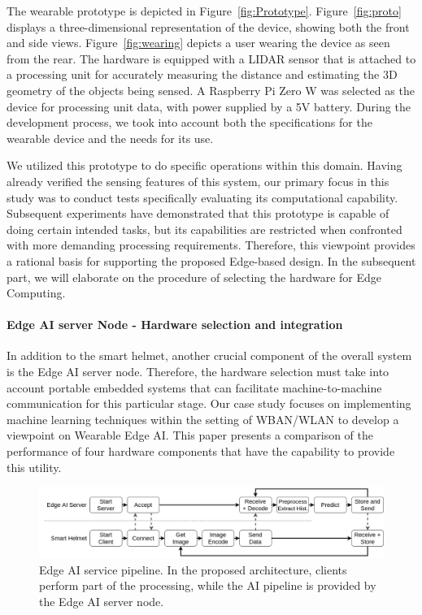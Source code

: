 The wearable prototype is depicted in Figure~\ref{fig:Prototype}. Figure~\ref{fig:proto} displays a three-dimensional representation of the device, showing both the front and side views. Figure~\ref{fig:wearing} depicts a user wearing the device as seen from the rear. The hardware is equipped with a LIDAR sensor that is attached to a processing unit for accurately measuring the distance and estimating the 3D geometry of the objects being sensed. A Raspberry Pi Zero W was selected as the device for processing unit data, with power supplied by a 5V battery. During the development process, we took into account both the specifications for the wearable device and the needs for its use.

We utilized this prototype to do specific operations within this domain. Having already verified the sensing features of this system, our primary focus in this study was to conduct tests specifically evaluating its computational capability. Subsequent experiments have demonstrated that this prototype is capable of doing certain intended tasks, but its capabilities are restricted when confronted with more demanding processing requirements. Therefore, this viewpoint provides a rational basis for supporting the proposed Edge-based design. In the subsequent part, we will elaborate on the procedure of selecting the hardware for Edge Computing.

\paragraph{Edge AI server Node - Hardware selection and integration}

In addition to the smart helmet, another crucial component of the overall system is the Edge AI server node. Therefore, the hardware selection must take into account portable embedded systems that can facilitate machine-to-machine communication for this particular stage. Our case study focuses on implementing machine learning techniques within the setting of WBAN/WLAN to develop a viewpoint on Wearable Edge AI. This paper presents a comparison of the performance of four hardware components that have the capability to provide this utility.

\begin{figure}[h!]
    \centering
    \includegraphics[width=\linewidth]{Figures/pipeline-Edge-AI.png}
    \caption{Edge AI service pipeline. In the proposed architecture, clients perform part of the processing, while the AI pipeline is provided by the Edge AI server node.}
    \label{fig:pipeline-edge-ai}
\end{figure}

